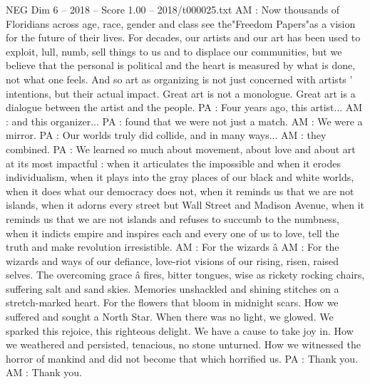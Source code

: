 \begin{textsample}{NEG Dim 6 – 2018 – Score 1.00 – 2018/t000025.txt}
AM : Now thousands of Floridians across age, race, gender and class see the"Freedom Papers"as a vision for the future of their lives.
For decades, our artists and our art has been used to exploit, lull, numb, sell things to us and to displace our communities, but we believe that the personal is political and the heart is measured by what is done, not what one feels.
And so art as organizing is not just concerned with artists ' intentions, but their actual impact.
Great art is not a monologue.
Great art is a dialogue between the artist and the people.
PA : Four years ago, this artist...
AM : and this organizer...
PA : found that we were not just a match.
AM : We were a mirror.
PA : Our worlds truly did collide, and in many ways...
AM : they combined.
PA : We learned so much about movement, about love and about art at its most impactful : when it articulates the impossible and when it erodes individualism, when it plays into the gray places of our black and white worlds, when it does what our democracy does not, when it reminds us that we are not islands, when it adorns every street but Wall Street and Madison Avenue, when it reminds us that we are not islands and refuses to succumb to the numbness, when it indicts empire and inspires each and every one of us to love, tell the truth and make revolution irresistible.
AM : For the wizards â AM : For the wizards and ways of our defiance, love-riot visions of our rising, risen, raised selves.
The overcoming grace â fires, bitter tongues, wise as rickety rocking chairs, suffering salt and sand skies.
Memories unshackled and shining stitches on a stretch-marked heart.
For the flowers that bloom in midnight scars.
How we suffered and sought a North Star.
When there was no light, we glowed.
We sparked this rejoice, this righteous delight.
We have a cause to take joy in.
How we weathered and persisted, tenacious, no stone unturned.
How we witnessed the horror of mankind and did not become that which horrified us.
PA : Thank you.
AM : Thank you.

\end{textsample}
